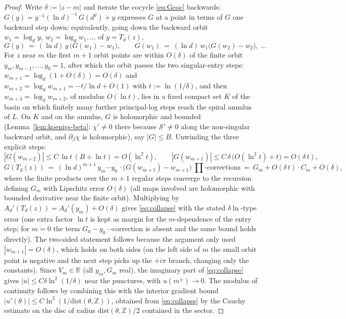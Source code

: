 \documentclass[11pt]{article}
\newcommand{\R}{\mathbb{R}}
\newcommand{\Z}{\mathbb{Z}}
\newcommand{\Sk}{\mathcal S}
\begin{document}
\begin{proof}
Write $\delta:=|z-m|$ and iterate the cocycle \eqref{eq:Gcoc} backwards:
$G(y)=y^{-1}(\ln d)^{-1}\,G(d^y)+y$ expresses $G$ at a point in terms of
$G$ one backward step down; equivalently, going down the backward orbit
$w_1=\log_d y,\ w_2=\log_d w_1,\dots$ of $y=T_d(z)$,
\[
  G(y)\ =\ (\ln d)\,y\,\bigl(G(w_1)-w_1\bigr),\qquad
  G(w_1)\ =\ (\ln d)\,w_1\bigl(G(w_2)-w_2\bigr),\ \dots
\]
For $z$ near $m$ the first $m{+}1$ orbit points are within $O(\delta)$ of
the finite orbit $y_m,y_{m-1},\dots,y_0=1$, after which the orbit passes
the two singular-entry steps: $w_{m+1}=\log_d(1+O(\delta))=O(\delta)$ and
$w_{m+2}=\log_d w_{m+1}=-t/\ln d+O(1)$ with $t:=\ln(1/\delta)$, and then
$w_{m+3}=\log_d w_{m+2}$, of modulus $O(\ln t)$, lies in a fixed compact
set $K$ of the basin on which finitely many further principal-log steps
reach the spiral annulus of $L$.  On $K$ and on the annulus, $G$ is
holomorphic and bounded (Lemma~\ref{lem:koenigs-beta}: $\chi'\ne0$ there
because $\Sk'\ne0$ along the non-singular backward orbit, and
$\partial_\beta\chi$ is holomorphic), say $|G|\le B$.  Unwinding the
three explicit steps:
\[
  |G(w_{m+2})|\le C\,\ln t\,(B+\ln t)=O(\ln^2 t),\qquad
  |G(w_{m+1})|\le C\,\delta\,\bigl(O(\ln^2 t)+t\bigr)=O(\delta\,t),
\]
\[
  G(T_d(z))\ =\ (\ln d)^{m+1}\,y_m\cdots y_0\,\cdot
  \bigl(G(w_{m+1})-w_{m+1}\bigr)\ \prod\text{-corrections}
  \ =\ G_m+O(\delta\,t)\cdot C_m+O(\delta),
\]
where the finite products over the $m{+}1$ regular steps converge to the
recursion defining $G_m$ with Lipschitz error $O(\delta)$ (all maps
involved are holomorphic with bounded derivative near the finite orbit).
Multiplying by $A_d'(T_d(z))=A_d'(y_m)+O(\delta)$ gives
\eqref{eq:collapse} with the stated $\delta\ln$-type error (one extra
factor $\ln t$ is kept as margin for the $m$-dependence of the entry
step; for $m=0$ the term $G_0-y_0\cdot$-correction is absent and the same
bound holds directly).  The two-sided statement follows because the
argument only used $|w_{m+1}|=O(\delta)$, which holds on both sides
(on the left side of $m$ the small orbit point is negative and the next
step picks up the $+i\pi$ branch, changing only the constants).  Since
$V_m\in\R$ (all $y_m,G_m$ real), the imaginary part of
\eqref{eq:collapse} gives $|u|\le C\delta\ln^2(1/\delta)$ near the
punctures, with $u(m^\pm)\to0$.  The modulus of continuity follows by
combining this with the interior gradient bound
$|u'(\theta)|\le C\ln^2(1/\mathrm{dist}(\theta,\Z))$, obtained from
\eqref{eq:collapse} by the Cauchy estimate on the disc of radius
$\mathrm{dist}(\theta,\Z)/2$ contained in the sector.
\end{proof}
\end{document}
